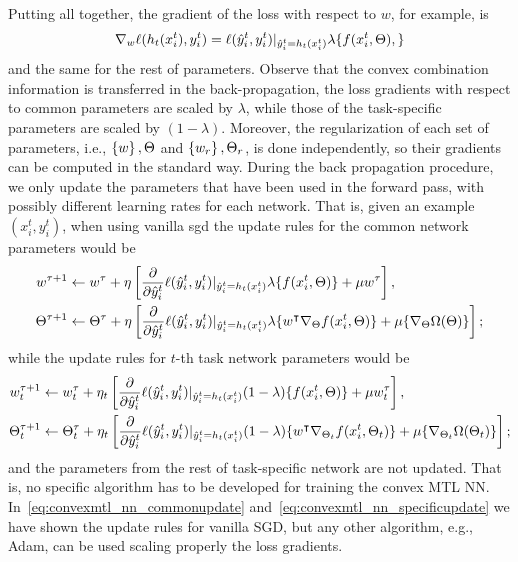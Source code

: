 Putting all together, the gradient of the loss with respect to $w$, for example, is 
$$  \nabla_w \ell(h_t(x_i^t), y_i^t)  =\ell(\hat{y}_i^t, y_i^t) \vert_{\hat{y}_i^t = h_t(x_i^t)} \lambda \lbrace f(x_i^t, \Theta), \rbrace $$
and the same for the rest of parameters.
%
Observe that the convex combination information is transferred in the back-propagation, the loss gradients with respect to common parameters are scaled by $\lambda$, while those of the task-specific parameters are scaled by $(1 - \lambda)$.
%
Moreover, the regularization of each set of parameters, i.e., $\left\{w\right\}, \Theta$ and $\left\{w_r\right\}, \Theta_r$, is done independently, so their gradients can be computed in the standard way.
%
During the back propagation procedure, we only update the parameters that have been used in the forward pass, with possibly different learning rates for each network. 
That is, given an example $(x_i^t, y_i^t)$, when using vanilla \acrshort{sgd} the update rules for the common network parameters would be
\begin{equation}\label{eq:convexmtl_nn_commonupdate}
    \begin{aligned}
        w^{\tau + 1} &\gets w^\tau + \eta \left[  \frac{\partial}{\partial \hat{y}_i^t}  \lossf(\hat{y}_i^t, y_i^t) \vert_{\hat{y}_i^t = h_t(x_i^t)} \lambda \lbrace f(x_i^t, \Theta) \rbrace + \mu w^\tau \right], \\
        \Theta^{\tau + 1} &\gets \Theta^\tau + \eta \left[ \frac{\partial}{\partial \hat{y}_i^t}  \lossf(\hat{y}_i^t, y_i^t) \vert_{\hat{y}_i^t = h_t(x_i^t)}  \lambda \lbrace w^\intercal \nabla_\Theta f(x_i^t, \Theta)\rbrace + \mu \lbrace \nabla_\Theta \Omega( \Theta)  \rbrace \right];
    \end{aligned}
\end{equation}
while the update rules for $t$-th task network parameters would be
\begin{equation}\label{eq:convexmtl_nn_specificupdate}
    \begin{aligned}
        w_t^{\tau + 1} &\gets w_t^\tau + \eta_t \left[  \frac{\partial}{\partial \hat{y}_i^t}  \lossf(\hat{y}_i^t, y_i^t) \vert_{\hat{y}_i^t = h_t(x_i^t)} (1 - \lambda) \lbrace f(x_i^t, \Theta) \rbrace + \mu w_t^\tau \right], \\
        \Theta_t^{\tau + 1} &\gets \Theta_t^\tau + \eta_t \left[ \frac{\partial}{\partial \hat{y}_i^t}  \lossf(\hat{y}_i^t, y_i^t) \vert_{\hat{y}_i^t = h_t(x_i^t)}  (1 - \lambda) \lbrace w^\intercal \nabla_{\Theta_t} f(x_i^t, \Theta_t)\rbrace + \mu \lbrace \nabla_{\Theta_t} \Omega( \Theta_t) \rbrace \right];
    \end{aligned}
\end{equation}
and the parameters from the rest of task-specific network are not updated.
%
That is, no specific algorithm has to be developed for training the convex MTL NN. In~\eqref{eq:convexmtl_nn_commonupdate} and~\eqref{eq:convexmtl_nn_specificupdate} we have shown the update rules for vanilla SGD, but any other algorithm, e.g., Adam, can be used scaling properly the loss gradients.

